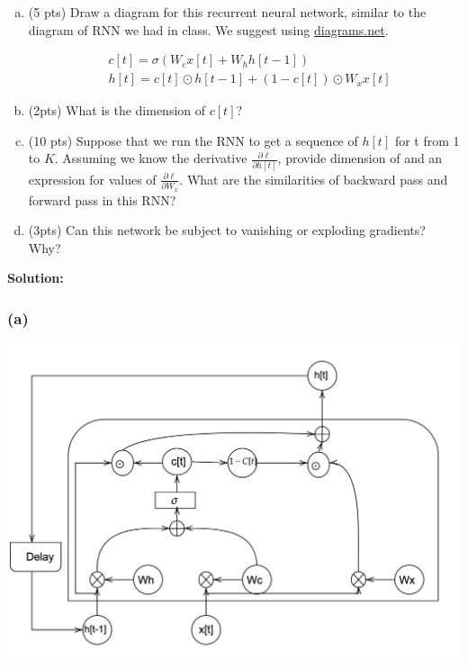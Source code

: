 \begin{enumerate}[(a)]
\item (5 pts) Draw a diagram for this recurrent neural network, similar to the diagram of RNN we had in class. We suggest using \href{http://www.diagrams.net}{diagrams.net}.

\begin{align}
    &c[t] = \sigma(W_c x[t] + W_h h[t - 1]) \\
    &h[t] = c[t] \odot h[{t-1}] + (1-c[t]) \odot W_x x[t]
\end{align}


\item (2pts) What is the dimension of $c[t]$?


\item (10 pts) Suppose that we run the RNN to get a sequence of $h[t]$ for t from 1 to $K$. Assuming we know the derivative $\frac{\partial \ell}{\partial h[t]}$, provide dimension of and an expression for values of $\frac{\partial \ell}{\partial W_x}$. What are the similarities of backward pass and forward pass in this RNN?


\item (3pts) Can this network be subject to vanishing or exploding gradients? Why?

\end{enumerate}

\textbf{Solution:}
\subsubsection*{(a)}

\includegraphics[width=\linewidth]{./images/1-2a.png}




